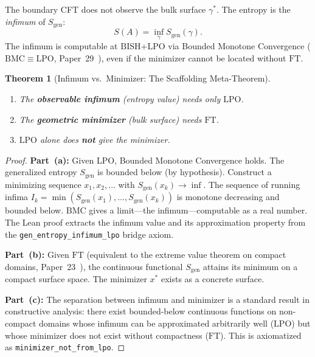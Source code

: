 \documentclass[11pt,a4paper]{article}
\theoremstyle{plain}
\newtheorem{theorem}{Theorem}[section]
\theoremstyle{definition}
\newcommand{\LPO}{\ensuremath{\mathrm{LPO}}}
\newcommand{\BISH}{\ensuremath{\mathrm{BISH}}}
\newcommand{\BMC}{\ensuremath{\mathrm{BMC}}}
\newcommand{\FT}{\ensuremath{\mathrm{FT}}}
\begin{document}
The boundary CFT does not observe the bulk surface $\gamma^*$.
The entropy is the \emph{infimum} of $S_{\mathrm{gen}}$:
\[
  S(A) = \inf_\gamma S_{\mathrm{gen}}(\gamma).
\]
The infimum is computable at $\BISH$+$\LPO$ via Bounded Monotone
Convergence ($\BMC \equiv \LPO$, Paper~29~\cite{Lee26P29}), even if
the minimizer cannot be located without $\FT$.

\begin{theorem}[Infimum vs.\ Minimizer: The Scaffolding Meta-Theorem]%
\label{thm:scaffold}
\hfill
\begin{enumerate}[nosep,label=(\alph*)]
\item The \textbf{observable infimum} (entropy value) needs only $\LPO$.
\item The \textbf{geometric minimizer} (bulk surface) needs $\FT$.
\item $\LPO$ alone does \textbf{not} give the minimizer.
\end{enumerate}
\end{theorem}

\begin{proof}
\textbf{Part~(a):} Given $\LPO$, Bounded Monotone Convergence holds.
The generalized entropy $S_{\mathrm{gen}}$ is bounded below (by hypothesis).
Construct a minimizing sequence $x_1, x_2, \ldots$ with
$S_{\mathrm{gen}}(x_k) \to \inf$.  The sequence of running infima
$I_k = \min(S_{\mathrm{gen}}(x_1), \ldots, S_{\mathrm{gen}}(x_k))$
is monotone decreasing and bounded below.  $\BMC$ gives a limit---the
infimum---computable as a real number.  The Lean proof extracts
the infimum value and its approximation property from the
\texttt{gen\_entropy\_infimum\_lpo} bridge axiom.

\medskip\noindent
\textbf{Part~(b):} Given $\FT$ (equivalent to the extreme value theorem
on compact domains, Paper~23~\cite{Lee26P23}), the continuous functional
$S_{\mathrm{gen}}$ attains its minimum on a compact surface space.
The minimizer $x^*$ exists as a concrete surface.

\medskip\noindent
\textbf{Part~(c):} The separation between infimum and minimizer is
a standard result in constructive analysis: there exist bounded-below
continuous functions on non-compact domains whose infimum can be
approximated arbitrarily well ($\LPO$) but whose minimizer does
not exist without compactness ($\FT$).  This is axiomatized as
\texttt{minimizer\_not\_from\_lpo}.
\end{proof}
\end{document}
